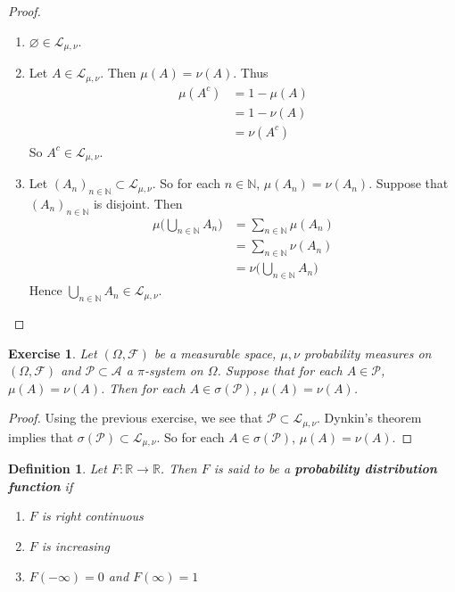 \documentclass[12pt]{amsart}
\newtheorem{defn}[thm]{Definition}
\newtheorem{ex}[thm]{Exercise}
\newcommand{\sig}{\sigma}
\newcommand{\Om}{\Omega}
\newcommand{\N}{\mathbb{N}}
\newcommand{\R}{\mathbb{R}}
\newcommand{\MA}{\mathcal{A}}
\newcommand{\MF}{\mathcal{F}}
\newcommand{\ML}{\mathcal{L}}
\newcommand{\MP}{\mathcal{P}}
\begin{document}
\begin{proof}\
	\begin{enumerate}
		\item $\varnothing \in \ML_{\mu, \nu}$.
		\item Let $A \in \ML_{\mu, \nu}$. Then $\mu(A) = \nu(A)$. Thus 
		\begin{align*}
			\mu(A^c) 
			&= 1-\mu(A) \\
			&= 1 -\nu(A) \\
			&= \nu(A^c)
		\end{align*}
		So $A^c \in \ML_{\mu, \nu}$. 
		\item Let $(A_n)_{n \in \N} \subset \ML_{\mu, \nu}$. So for each $n \in \N$, $\mu(A_n) = \nu(A_n)$.  Suppose that $(A_n)_{n \in \N}$ is disjoint. Then 
		\begin{align*}
			\mu\bigg(\bigcup_{n \in \N} A_n\bigg) 
			&= \sum_{n \in \N} \mu(A_n) \\
			&= \sum_{n \in \N} \nu(A_n) \\
			&= \nu\bigg(\bigcup_{n \in \N} A_n\bigg) 
		\end{align*}
		Hence $\bigcup_{n \in \N} A_n \in \ML_{\mu, \nu}$.
	\end{enumerate}
\end{proof}

\begin{ex}
	Let $(\Om, \MF)$ be a measurable space, $\mu, \nu$ probability measures on $(\Om, \MF)$ and $\MP \subset \MA$ a $\pi$-system on $\Om$. Suppose that for each $A \in \MP$, $\mu(A) = \nu(A)$. Then for each $A \in \sig(\MP)$, $\mu(A) = \nu(A)$.
\end{ex}

\begin{proof}
	Using the previous exercise, we see that $\MP \subset \ML_{\mu, \nu}$. Dynkin's theorem implies that $\sig(\MP) \subset \ML_{\mu, \nu}$. So for each $A \in \sig(\MP)$, $\mu(A) = \nu(A)$.
\end{proof}








\begin{defn}
	Let $F: \R \rightarrow \R$. Then $F$ is said to be a \textbf{probability distribution function} if 
	\begin{enumerate}
		\item $F$ is right continuous
		\item $F$ is increasing
		\item $F(-\infty)  = 0$ and $F(\infty)  = 1$
	\end{enumerate}
\end{defn}
\end{document}
